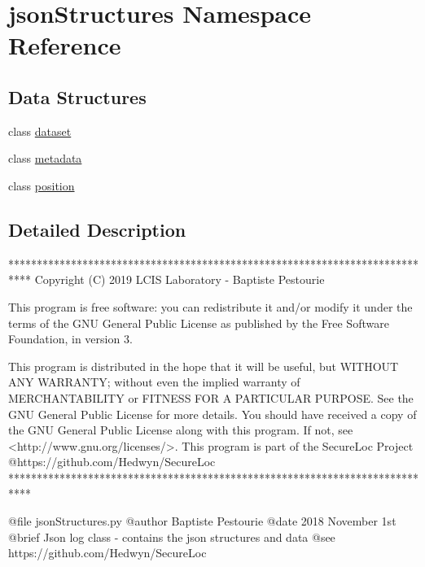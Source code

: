 \hypertarget{namespacejson_structures}{}\section{json\+Structures Namespace Reference}
\label{namespacejson_structures}
\subsection*{Data Structures}
\begin{DoxyCompactItemize}
\item 
class \mbox{\hyperlink{classjson_structures_1_1dataset}{dataset}}
\item 
class \mbox{\hyperlink{classjson_structures_1_1metadata}{metadata}}
\item 
class \mbox{\hyperlink{classjson_structures_1_1position}{position}}
\end{DoxyCompactItemize}


\subsection{Detailed Description}
\begin{DoxyVerb}****************************************************************************
Copyright (C) 2019 LCIS Laboratory - Baptiste Pestourie

This program is free software: you can redistribute it and/or modify
it under the terms of the GNU General Public License as published by
the Free Software Foundation, in version 3.

This program is distributed in the hope that it will be useful,
but WITHOUT ANY WARRANTY; without even the implied warranty of
MERCHANTABILITY or FITNESS FOR A PARTICULAR PURPOSE. See the
GNU General Public License for more details.
You should have received a copy of the GNU General Public License
along with this program. If not, see <http://www.gnu.org/licenses/>.
This program is part of the SecureLoc Project @https://github.com/Hedwyn/SecureLoc
 ****************************************************************************

@file jsonStructures.py
@author Baptiste Pestourie
@date 2018 November 1st
@brief Json log class - contains the json structures and data
@see https://github.com/Hedwyn/SecureLoc
\end{DoxyVerb}
 